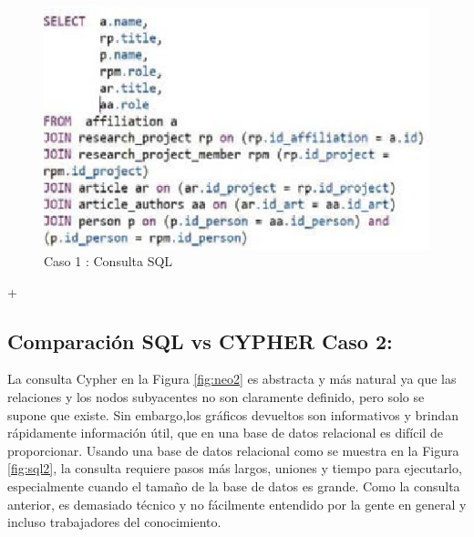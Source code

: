     \begin{figure}[H]
    \centering
    \includegraphics[scale=0.7]{Graficos/sql1.png}
    \caption{Caso 1 : Consulta SQL}
    \label{fig:sql1}
    \end{figure}+

\subsection{Comparación SQL vs CYPHER Caso 2:}
La consulta Cypher en la Figura \ref{fig:neo2} es abstracta y más natural
ya que las relaciones y los nodos subyacentes no son claramente
definido, pero solo se supone que existe. Sin embargo,los gráficos devueltos son informativos y brindan rápidamente información útil, que en una base de datos relacional es difícil de proporcionar.
Usando una base de datos relacional como se muestra en la Figura \ref{fig:sql2}, la consulta requiere pasos más largos, uniones y tiempo para ejecutarlo, especialmente cuando el tamaño de la base de datos es grande. Como la consulta anterior, es demasiado técnico y no fácilmente entendido por la gente en general y incluso trabajadores del conocimiento.

